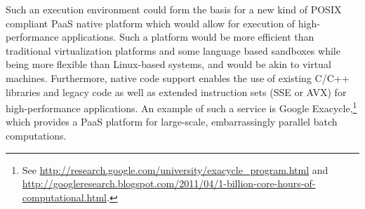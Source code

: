 

Such an execution environment could form the basis for a new kind of
POSIX compliant PaaS native platform which would allow for execution of
high-performance applications. Such a platform would be more efficient
than traditional virtualization platforms and some language based
sandboxes while being more flexible than Linux-based systems, and would
be akin to virtual machines.  Furthermore, native code support enables
the use of existing C/C++ libraries and legacy code as well as extended
instruction sets (\eg SSE or AVX) for high-performance applications. An
example of such a service is Google Exacycle,\footnote{See
\url{http://research.google.com/university/exacycle_program.html} and
\url{http://googleresearch.blogspot.com/2011/04/1-billion-core-hours-of-computational.html}.}
which provides a PaaS platform for large-scale, embarrassingly parallel
batch computations.


